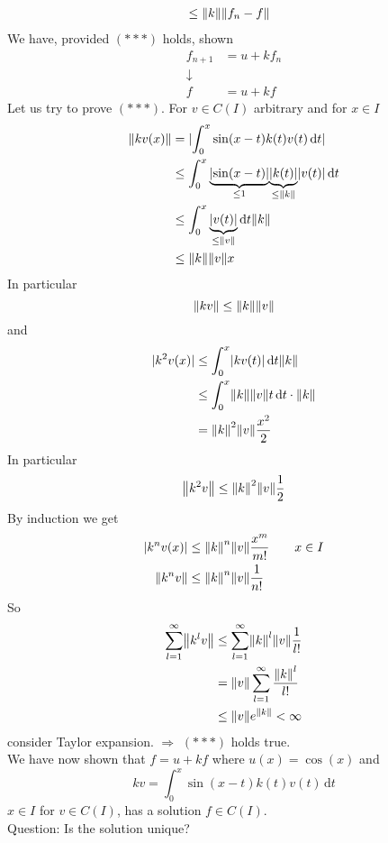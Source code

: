 \begin{enumerate}[1.]
\begin{align*}
		&\leq \norm{k} \norm{f_n-f}
	\end{align*}
	We have, provided $(***)$ holds, shown
	\begin{align*}
		f_{n+1} &= u + k f_n \\
		\downarrow & \\
		f &= u + kf
	\end{align*}
	Let us try to prove $(***)$. For $v \in C(I)$ arbitrary and for $x \in I$
	\begin{align*}
		\norm{kv(x)} &= \abs{\int_{0}^{x}\sin(x-t)k(t)v(t) \,\mathrm{d}t} \\
		&\leq \int_{0}^{x}\underset{\leq 1}{\underbrace{\abs{\sin(x-t)}}}\underset{\leq \norm{k}}{\underbrace{\abs{k(t)}}}\abs{v(t)} \,\mathrm{d}t \\
		&\leq \int_{0}^{x}\underset{\leq \norm{v}}{\underbrace{\abs{v(t)}}} \,\mathrm{d}t \norm{k} \\
		&\leq \norm{k} \norm{v}x
	\end{align*}
	In particular
	\[
		\norm{kv} \leq \norm{k}\norm{v}
	\]
	and
	\begin{align*}
		\abs{k^2v(x)} &\leq \int_{0}^{x} \abs{kv(t)} \,\mathrm{d}t \norm{k} \\
		&\leq \int_{0}^{x}\norm{k}\norm{v}t \,\mathrm{d}t \cdot \norm{k} \\
		&= \norm{k}^2 \norm{v} \frac{x^2}{2}
	\end{align*}
	In particular
	\[
		\norm{k^2v} \leq \norm{k}^2 \norm{v} \frac{1}{2}
	\]
	By induction we get
	\begin{align*}
		\abs{k^n v(x)} &\leq \norm{k}^n \norm{v} \frac{x^m}{m!} \qquad x \in I \\
		\norm{k^n v} &\leq  \norm{k}^n \norm{v} \frac{1}{n!}
	\end{align*}
	So 
	\begin{align*}
		\sum_{l=1}^{\infty}\norm{k^lv} &\leq \sum_{l=1}^{\infty}\norm{k}^l \norm{v} \frac{1}{l!} \\
		&= \norm{v} \sum_{l=1}^{\infty} \frac{\norm{k}^l}{l!} \\
		&\leq \norm{v} e^{\norm{k}} < \infty
	\end{align*}
	consider Taylor expansion.
	$\Rightarrow $ $(***)$ holds true. \\
	We have now shown that $f = u+kf$ where $u(x) = \cos(x)$ and
	\[
		kv = \int_{0}^{x}\sin(x-t)k(t)v(t) \,\mathrm{d}t
	\]
	$x \in I$ for $v \in C(I)$, has a solution $f \in C(I)$. \\
	Question: Is the solution unique? \\

\end{enumerate}
